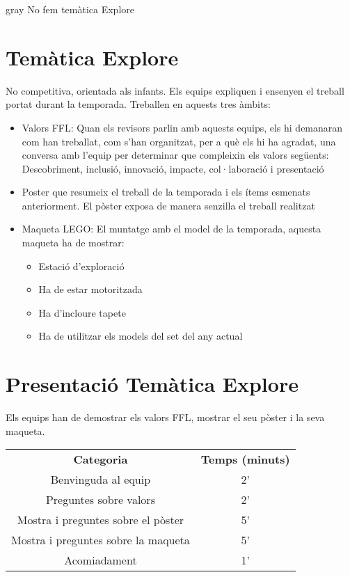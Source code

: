 \documentclass{article}
\begin{document}
\begin{color}{gray}
\hfill \break\hfill \break
\textit{}{No fem temàtica Explore}
\section{Temàtica Explore}
No competitiva, orientada als infants. Els equips expliquen i ensenyen el treball portat durant la temporada. Treballen en aquests tres àmbits:

\begin{itemize}
  \item Valors FFL: Quan els revisors parlin amb aquests equips, els hi demanaran com han treballat, com s’han organitzat, per a què els hi ha agradat, una conversa amb l’equip per determinar que compleixin els valors següents: Descobriment, inclusió, innovació, impacte, col·laboració i presentació
  \item Poster que resumeix el treball de la temporada i els ítems esmenats anteriorment. El pòster exposa de manera senzilla el treball realitzat
  \item Maqueta LEGO: El muntatge amb el model de la temporada, aquesta maqueta ha de mostrar:
  \begin{itemize}
    \item Estació d'exploració
    \item Ha de estar motoritzada
    \item Ha d'incloure tapete 
    \item Ha de utilitzar els models del set del any actual
  \end{itemize}
\end{itemize}



\section{Presentació Temàtica Explore}

Els equips han de demostrar els valors FFL, mostrar el seu pòster i la seva maqueta.
\break
\break
\begin{tabular}{ |c|c| } 
 \hline
 \textbf{Categoria} & \textbf{Temps (minuts)}\\ 
 Benvinguda al equip  & 2'  \\ 
 Preguntes sobre valors & 2'  \\ 
 Mostra i preguntes sobre el pòster & 5' \\ 
 Mostra i preguntes sobre la maqueta & 5'  \\ 
 Acomiadament & 1'  \\ 
 \hline
\end{tabular}

\end{color}
\end{document}
